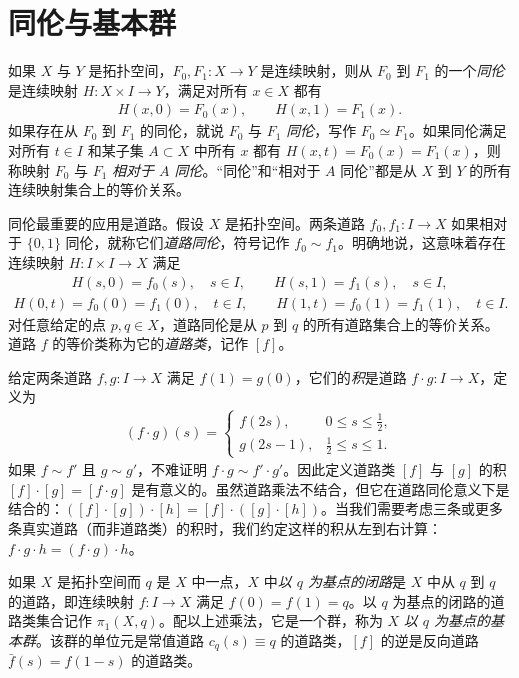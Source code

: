 \documentclass[../../main.tex]{subfiles}
\begin{document}
\section{同伦与基本群}\label{section:appA-homotopy-fundamental-group}

如果 $X$ 与 $Y$ 是拓扑空间，$F_0,F_1:X\to Y$ 是连续映射，则从 $F_0$ 到 $F_1$ 的一个\emph{同伦}是连续映射 $H:X\times I\to Y$，满足对所有 $x\in X$ 都有
\begin{align*}
H(x,0)=F_0(x),\qquad H(x,1)=F_1(x).
\end{align*}
如果存在从 $F_0$ 到 $F_1$ 的同伦，就说 $F_0$ 与 $F_1$ \emph{同伦}，写作 $F_0\simeq F_1$。如果同伦满足对所有 $t\in I$ 和某子集 $A\subset X$ 中所有 $x$ 都有 $H(x,t)=F_0(x)=F_1(x)$，则称映射 $F_0$ 与 $F_1$ \emph{相对于 $A$ 同伦}。“同伦”和“相对于 $A$ 同伦”都是从 $X$ 到 $Y$ 的所有连续映射集合上的等价关系。

同伦最重要的应用是道路。假设 $X$ 是拓扑空间。两条道路 $f_0,f_1:I\to X$ 如果相对于 $\{0,1\}$ 同伦，就称它们\emph{道路同伦}，符号记作 $f_0\sim f_1$。明确地说，这意味着存在连续映射 $H:I\times I\to X$ 满足
\begin{align*}
H(s,0)=f_0(s),\quad s\in I,\qquad
H(s,1)=f_1(s),\quad s\in I,
\end{align*}
\begin{align*}
H(0,t)=f_0(0)=f_1(0),\quad t\in I,\qquad
H(1,t)=f_0(1)=f_1(1),\quad t\in I.
\end{align*}
对任意给定的点 $p,q\in X$，道路同伦是从 $p$ 到 $q$ 的所有道路集合上的等价关系。道路 $f$ 的等价类称为它的\emph{道路类}，记作 $[f]$。

给定两条道路 $f,g:I\to X$ 满足 $f(1)=g(0)$，它们的\emph{积}是道路 $f\cdot g:I\to X$，定义为
\begin{align*}
(f\cdot g)(s)=
\begin{cases}
f(2s),&0\leqslant s\leqslant\tfrac12,\\
g(2s-1),&\tfrac12\leqslant s\leqslant1.
\end{cases}
\end{align*}
如果 $f\sim f'$ 且 $g\sim g'$，不难证明 $f\cdot g\sim f'\cdot g'$。因此定义道路类 $[f]$ 与 $[g]$ 的积 $[f]\cdot[g]=[f\cdot g]$ 是有意义的。虽然道路乘法不结合，但它在道路同伦意义下是结合的：$([f]\cdot[g])\cdot[h]=[f]\cdot([g]\cdot[h])$。当我们需要考虑三条或更多条真实道路（而非道路类）的积时，我们约定这样的积从左到右计算：$f\cdot g\cdot h=(f\cdot g)\cdot h$。

如果 $X$ 是拓扑空间而 $q$ 是 $X$ 中一点，$X$ 中\emph{以 $q$ 为基点的闭路}是 $X$ 中从 $q$ 到 $q$ 的道路，即连续映射 $f:I\to X$ 满足 $f(0)=f(1)=q$。以 $q$ 为基点的闭路的道路类集合记作 $\pi_1(X,q)$。配以上述乘法，它是一个群，称为 $X$ \emph{以 $q$ 为基点的基本群}。该群的单位元是常值道路 $c_q(s)\equiv q$ 的道路类，$[f]$ 的逆是反向道路 $\bar f(s)=f(1-s)$ 的道路类。
\end{document}
